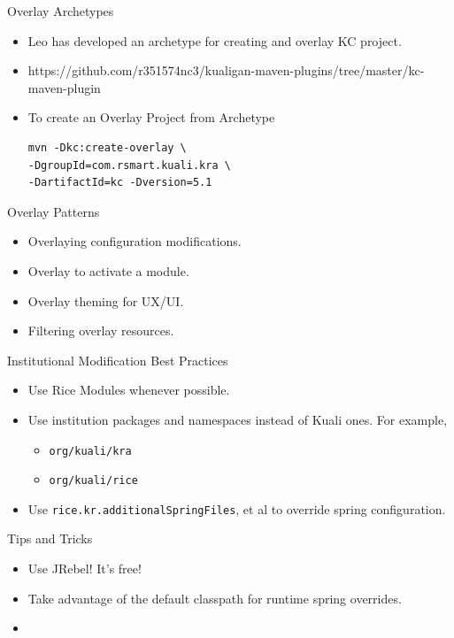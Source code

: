 \documentclass[xcolor=dvipsnames,14pt,professionalfonts]{beamer}
\begin{document}
\begin{frame}[fragile]{Overlay Archetypes}
  \begin{itemize}
  \item Leo has developed an archetype for creating and overlay KC project.
  \item https://github.com/r351574nc3/kualigan-maven-plugins/tree/master/kc-maven-plugin
  \item To create an Overlay Project from Archetype
  \begin{verbatim}
mvn -Dkc:create-overlay \
-DgroupId=com.rsmart.kuali.kra \
-DartifactId=kc -Dversion=5.1
  \end{verbatim}
  \end{itemize}
\end{frame}

\begin{frame}{Overlay Patterns}
  \begin{itemize}
    \item Overlaying configuration modifications.
    \item Overlay to activate a module.
    \item Overlay theming for UX/UI.
    \item Filtering overlay resources.
  \end{itemize}
\end{frame}

\begin{frame}[fragile]{Institutional Modification Best Practices}
  \begin{itemize}
    \item Use Rice Modules whenever possible.
    \item Use institution packages and namespaces instead of Kuali ones. For example,
      \begin{itemize}
        \item \texttt{org/kuali/kra}
        \item \texttt{org/kuali/rice}
      \end{itemize}
    \item Use \texttt{rice.kr.additionalSpringFiles}, et al to override spring configuration.
  \end{itemize}
\end{frame}

\begin{frame}[fragile]{Tips and Tricks}
  \begin{itemize}
    \item Use JRebel! It's free!
    \item Take advantage of the default classpath for runtime spring overrides.
    \item
  \end{itemize}
\end{frame}
\end{document}
